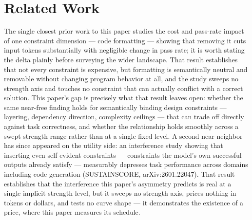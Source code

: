 \documentclass[11pt]{article}
\begin{document}
\section{Related Work}

The single closest prior work to this paper studies the cost and pass-rate impact of one constraint dimension --- code formatting --- showing that removing it cuts input tokens substantially with negligible change in pass rate; it is worth stating the delta plainly before surveying the wider landscape. That result establishes that not every constraint is expensive, but formatting is semantically neutral and removable without changing program behavior at all, and the study sweeps no strength axis and touches no constraint that can actually conflict with a correct solution. This paper's gap is precisely what that result leaves open: whether the same near-free finding holds for semantically binding design constraints --- layering, dependency direction, complexity ceilings --- that can trade off directly against task correctness, and whether the relationship holds smoothly across a swept strength range rather than at a single fixed level. A second near neighbor has since appeared on the utility side: an interference study showing that inserting even self-evident constraints --- constraints the model's own successful outputs already satisfy --- measurably depresses task performance across domains including code generation (SUSTAINSCORE, arXiv:2601.22047). That result establishes that the interference this paper's asymmetry predicts is real at a single implicit strength level, but it sweeps no strength axis, prices nothing in tokens or dollars, and tests no curve shape --- it demonstrates the existence of a price, where this paper measures its schedule.
\end{document}

